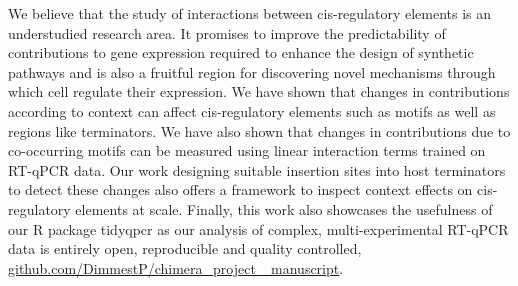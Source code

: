 \documentclass[../main.tex]{subfiles}
\begin{document}
We believe that the study of interactions between cis-regulatory elements is an understudied research area. 
It promises to improve the predictability of contributions to gene expression required to enhance the design of synthetic pathways and is also a fruitful region for discovering novel mechanisms through which cell regulate their expression. 
We have shown that changes in contributions according to context can affect cis-regulatory elements such as motifs as well as regions like terminators. 
We have also shown that changes in contributions due to co-occurring motifs can be measured using linear interaction terms trained on  RT-qPCR data. 
Our work designing suitable insertion sites into host terminators to detect these changes also offers a framework to inspect context effects on cis-regulatory elements at scale. 
Finally, this work also showcases the usefulness of our R package tidyqpcr as our analysis of complex, multi-experimental  RT-qPCR data is entirely open, reproducible and quality controlled, \href{https://github.com/DimmestP/chimera_project_manuscript}{github.com/DimmestP/chimera\_project\_ manuscript}.
\end{document}
